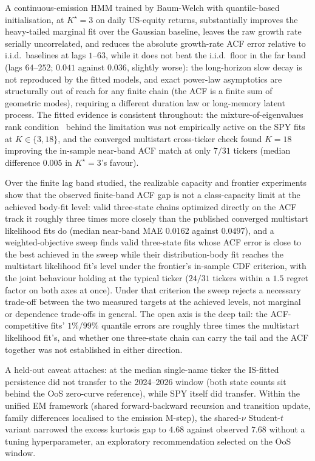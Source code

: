 A continuous-emission HMM trained by Baum-Welch with quantile-based initialisation, at $K^\star = 3$ on daily US-equity returns, substantially improves the heavy-tailed marginal fit over the Gaussian baseline, leaves the raw growth rate serially uncorrelated, and reduces the absolute growth-rate ACF error relative to i.i.d.\ baselines at lags $1$--$63$, while it does not beat the i.i.d.\ floor in the far band (lags $64$--$252$; $0.041$ against $0.036$, slightly worse): the long-horizon slow decay is not reproduced by the fitted models, and exact power-law asymptotics are structurally out of reach for any finite chain (the ACF is a finite sum of geometric modes), requiring a different duration law or long-memory latent process. The fitted evidence is consistent throughout: the mixture-of-eigenvalues rank condition~\cite{hamilton1994time, krolzig1997markov, timmermann2000moments} behind the \citet{ryden1998stylized} limitation was not empirically active on the SPY fits at $K \in \{3, 18\}$, and the converged multistart cross-ticker check found $K = 18$ improving the in-sample near-band ACF match at only $7/31$ tickers (median difference $0.005$ in $K^\star = 3$'s favour).

Over the finite lag band studied, the realizable capacity and frontier experiments show that the observed finite-band ACF gap is not a class-capacity limit at the achieved body-fit level: valid three-state chains optimized directly on the ACF track it roughly three times more closely than the published converged multistart likelihood fits do (median near-band MAE $0.0162$ against $0.0497$), and a weighted-objective sweep finds valid three-state fits whose ACF error is close to the best achieved in the sweep while their distribution-body fit reaches the multistart likelihood fit's level under the frontier's in-sample CDF criterion, with the joint behaviour holding at the typical ticker ($24/31$ tickers within a $1.5$ regret factor on both axes at once). Under that criterion the sweep rejects a necessary trade-off between the two measured targets at the achieved levels, not marginal or dependence trade-offs in general. The open axis is the deep tail: the ACF-competitive fits' $1\%$/$99\%$ quantile errors are roughly three times the multistart likelihood fit's, and whether one three-state chain can carry the tail and the ACF together was not established in either direction.

A held-out caveat attaches: at the median single-name ticker the IS-fitted persistence did not transfer to the 2024--2026 window (both state counts sit behind the OoS zero-curve reference), while SPY itself did transfer. Within the unified EM framework (shared forward-backward recursion and transition update, family differences localised to the emission M-step), the shared-$\nu$ Student-$t$ variant narrowed the excess kurtosis gap to $4.68$ against observed $7.68$ without a tuning hyperparameter, an exploratory recommendation selected on the OoS window.


